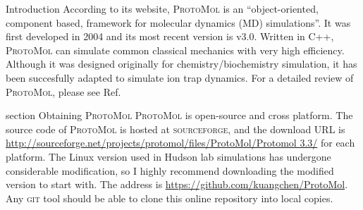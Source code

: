 \documentclass{article}
\begin{document}
\begin{section} {Introduction}
 According to its website, \textsc{ProtoMol} is an ``object-oriented, component based, framework for molecular dynamics (MD) simulations''. It was first developed in 2004 and its most recent version is v3.0. Written in \textsc{C++},  \textsc{ProtoMol} can simulate common classical mechanics with very high efficiency. Although it was designed originally for chemistry/biochemistry simulation, it has been succesfully adapted to simulate ion trap dynamics. For a detailed review of \textsc{ProtoMol}, please see Ref. 
\end{section}
{section} {Obtaining \textsc{ProtoMol}}
\textsc{ProtoMol} is open-source and cross platform. The source code of \textsc{ProtoMol} is hosted at \textsc{sourceforge}, and the download URL is \url{http://sourceforge.net/projects/protomol/files/ProtoMol/Protomol 3.3/} for each platform. The Linux version used in Hudson lab simulations has undergone considerable modification, so I highly recommend downloading the modified version to start with. The address is \url{https://github.com/kuangchen/ProtoMol}. Any \textsc{git} tool should be able to clone this online repository into local copies.
\end{document}
